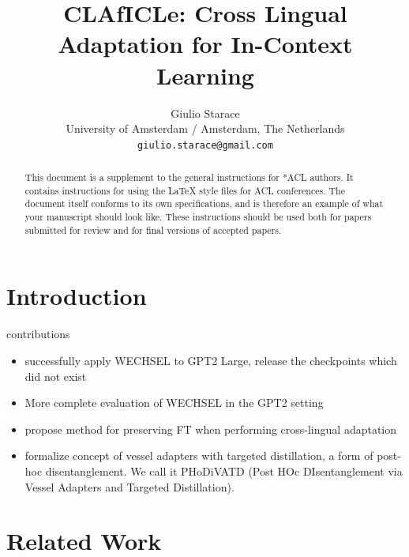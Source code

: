 \documentclass[11pt]{article}
\title{CLAfICLe: Cross Lingual Adaptation for In-Context Learning}
\author{Giulio Starace \\
  University of Amsterdam / Amsterdam, The Netherlands \\
  \texttt{giulio.starace@gmail.com} \\}
\begin{document}
\maketitle
\begin{abstract}
	This document is a supplement to the general instructions for *ACL authors. It contains instructions for using the \LaTeX{} style files for ACL conferences.
	The document itself conforms to its own specifications, and is therefore an example of what your manuscript should look like.
	These instructions should be used both for papers submitted for review and for final versions of accepted papers.
\end{abstract}

\section{Introduction}

contributions
\begin{itemize}
	\item successfully apply WECHSEL to GPT2 Large, release the checkpoints which did not exist
	\item More complete evaluation of WECHSEL in the GPT2 setting
	\item propose method for preserving FT when performing cross-lingual adaptation
	\item formalize concept of vessel adapters with targeted distillation, a form of post-hoc
	      disentanglement. We call it PHoDiVATD (Post HOc DIsentanglement via Vessel Adapters and
	      Targeted Distillation).
\end{itemize}

\section{Related Work}
\end{document}
